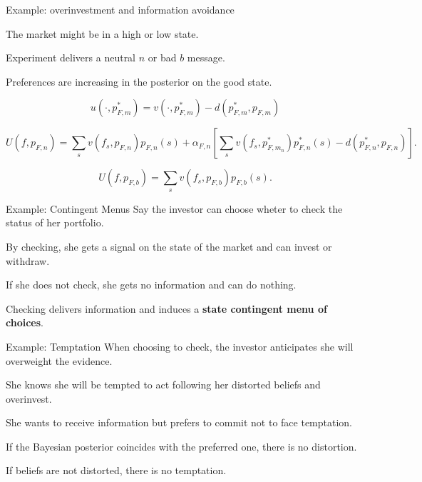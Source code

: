 \documentclass[usenames,dvipsnames,aspectratio=169,11pt, envcountsect]{beamer}
\begin{document}
\begin{frame}{Example: overinvestment and information avoidance}

	The market might be in a high or low state.

	\vfill

	Experiment delivers a neutral \( n \) or bad \( b \) message.

	\vfill

	Preferences are increasing in the posterior on the good state.

	\vfill

	\[ u \left( \cdot , p^{*}_{F,m } \right) = v \left( \cdot, p^{*}_{F, m} \right) - d \left( p^{*}_{F, m} , p_{F, m} \right)
	\] \pause

	\[
		U \left( f, p_{F,n} \right) = \sum_{s} v \left( f_s, p_{F,n} \right) p_{F, n} \left( s \right) + \alpha_{F, n} \left[ \sum_{s} v \left( f_s, p^{*}_{F, m_n} \right) p^{*}_{F,n} \left( s \right) - d(p^{*}_{F,n}, p_{F,n}) \right].
	\] \pause

	\[
		U \left( f, p_{F,b} \right) = \sum_{s} v \left( f_s, p_{F,b} \right) p_{F,b} \left( s \right) .
	\]

\end{frame}

\begin{frame}{Example: Contingent Menus}
	Say the investor can choose wheter to check the status of her portfolio.

	\vfill

	By checking, she gets a signal on the state of the market and can invest or withdraw.

	\vfill

	If she does not check, she gets no information and can do nothing.

	\vfill

	Checking delivers information and induces a \textbf{state contingent menu of choices}.
\end{frame}

\begin{frame}{Example: Temptation}
	When choosing to check, the investor anticipates she will overweight the evidence.

	\vfill

	She knows she will be tempted to act following her distorted beliefs and overinvest.

	\vfill

	She wants to receive information but prefers to commit not to face temptation.

	\vfill \pause

	If the Bayesian posterior coincides with the preferred one, there is no distortion.

	\vfill

	If beliefs are not distorted, there is no temptation.
\end{frame}
\end{document}
